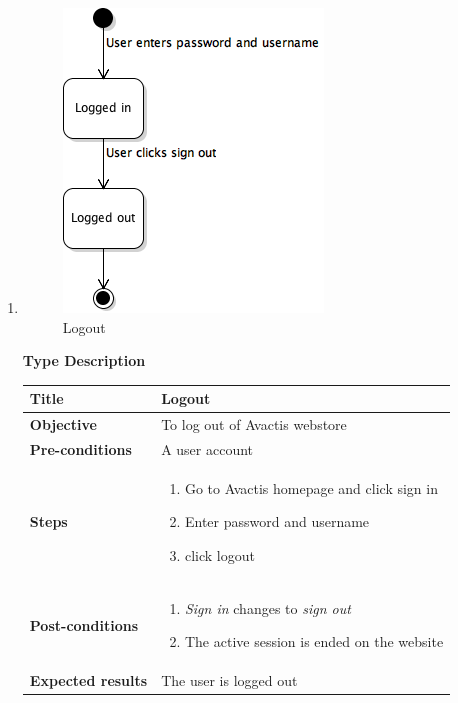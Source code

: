 \documentclass[UKenglish,12pt]{article}
\begin{document}
\begin{enumerate}
\item
\begin{figure}[!h]
\centering
\includegraphics[scale=0.8,keepaspectratio]{Images/Logout.png}
\caption{Logout}
\end{figure}
\newpage
\textbf{\hspace{0.3cm}Type\hspace{4.4cm} Description}
\newline \vspace{0.2cm}
\begin{tabular}{| p{5cm} | p{10cm} | }
	\hline
	 \textbf{Title} & Logout \\ \hline
	 \textbf{Objective} & To log out of Avactis webstore \\ \hline
	 \textbf{Pre-conditions} & A user account \\ \hline
	 \textbf{Steps} & \begin{enumerate} \item Go to Avactis homepage and click sign in \item Enter password and username \item click logout  \end{enumerate}\\ \hline
	 \textbf{Post-conditions} & \begin{enumerate}\item\textit{Sign in} changes to \textit{sign out} \item The active session is ended on the website \end{enumerate}  \\ \hline
	 \textbf{Expected results} & The user is logged out\\ 
	 \hline
\end{tabular} %





\end{enumerate}
\end{document}
